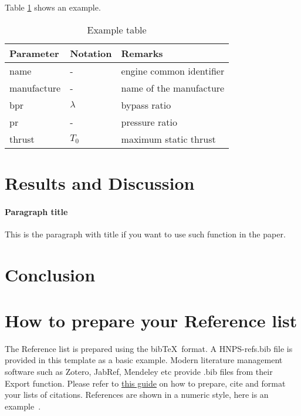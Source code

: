 \documentclass[
  manuscript=article,  %
  layout=publish,  %
  year=20XX,
  volume=XX,
]{extras/hnpsanp}
\begin{document}
\blindtext Table \ref{tb:example_table} shows an example.

\begin{table}[H]
  \centering
  \small
  \caption{Example table}
  \label{tb:example_table}
  \begin{tabular}{lll}
  \toprule
  \textbf{Parameter} & \textbf{Notation} & \textbf{Remarks} \\
  \midrule
  name & - & engine common identifier \\
  manufacture & - & name of the manufacture  \\
  bpr & $\lambda$ & bypass ratio \\
  pr & - & pressure ratio \\
  thrust & $T_0$ & maximum static thrust\\
  \bottomrule
  \end{tabular}
\end{table}

\blindtext


\section{Results and Discussion}

\paragraph{Paragraph title} This is the paragraph with title if you want to use such function in the paper. \blindtext


\section{Conclusion}

\blindtext


\section*{How to prepare your Reference list}

The Reference list is prepared using the bib\TeX\ format. A HNPS-refs.bib file is provided in this template as a basic example.
Modern literature management software such as Zotero, JabRef, Mendeley etc provide .bib files from their Export function. Please
refer to \href{https://www.overleaf.com/learn/latex/Bibliography_management_in_LaTeX}{this guide} on how to prepare, cite and
format your lists of citations. References are shown in a numeric style, here is an example~\cite{python}.
\end{document}
